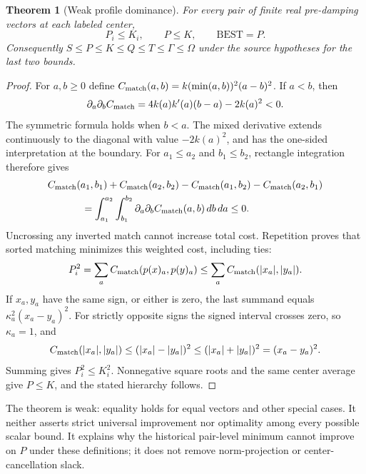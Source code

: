 \documentclass[11pt,a4paper]{article}
\newtheorem{theorem}{Theorem}\newtheorem{proposition}[theorem]{Proposition}
\begin{document}
\begin{theorem}[Weak profile dominance]\label{thm:dominance}
For every pair of finite real pre-damping vectors at each labeled center,
\[
P_i\le K_i,\qquad P\le K,\qquad \mathrm{BEST}=P.
\]
Consequently $S\le P\le K\le Q\le T\le\Gamma\le\Omega$ under the source hypotheses for the last two bounds.
\end{theorem}
\begin{proof}
For $a,b\ge0$ define $C_{\rm match}(a,b)=k(\min(a,b))^2(a-b)^2$. If $a<b$, then
\begin{equation}\label{eq:mixed}
\partial_a\partial_b C_{\rm match}
=4k(a)k'(a)(b-a)-2k(a)^2<0.
\end{equation}
The symmetric formula holds when $b<a$. The mixed derivative extends continuously to the diagonal with value $-2k(a)^2$, and has the one-sided interpretation at the boundary. For $a_1\le a_2$ and $b_1\le b_2$, rectangle integration therefore gives
\begin{align}\label{eq:exchange}
&C_{\rm match}(a_1,b_1)+C_{\rm match}(a_2,b_2)
-C_{\rm match}(a_1,b_2)-C_{\rm match}(a_2,b_1)\notag\\
&\hspace{12mm}=\int_{a_1}^{a_2}\int_{b_1}^{b_2}\partial_a\partial_b C_{\rm match}(a,b)\,db\,da\le0.
\end{align}
Uncrossing any inverted match cannot increase total cost. Repetition proves that sorted matching minimizes this weighted cost, including ties:
\[
P_i^2=\sum_a C_{\rm match}(p(x)_a,p(y)_a)
\le\sum_a C_{\rm match}(|x_a|,|y_a|).
\]
If $x_a,y_a$ have the same sign, or either is zero, the last summand equals $\kappa_a^2(x_a-y_a)^2$. For strictly opposite signs the signed interval crosses zero, so $\kappa_a=1$, and
\[
C_{\rm match}(|x_a|,|y_a|)\le(|x_a|-|y_a|)^2
\le(|x_a|+|y_a|)^2=(x_a-y_a)^2.
\]
Summing gives $P_i^2\le K_i^2$. Nonnegative square roots and the same center average give $P\le K$, and the stated hierarchy follows.
\end{proof}
The theorem is weak: equality holds for equal vectors and other special cases. It neither asserts strict universal improvement nor optimality among every possible scalar bound. It explains why the historical pair-level minimum cannot improve on $P$ under these definitions; it does not remove norm-projection or center-cancellation slack.

\clearpage
\end{document}
